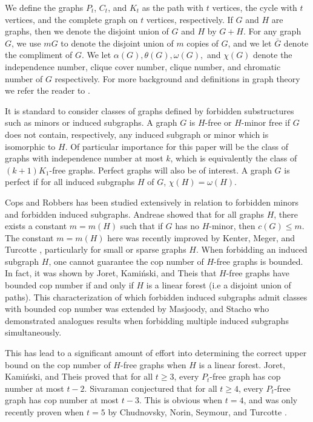 \documentclass[12pt]{amsart}
\theoremstyle{definition}
\begin{document}
We define the graphs $P_t$, $C_t$, and $K_t$ as the path with $t$ vertices, the cycle with $t$ vertices, and the complete graph on $t$ vertices, respectively.
If $G$ and $H$ are graphs, then we denote the disjoint union of $G$ and $H$ by $G+H$.
For any graph $G$, we use $mG$ to denote the disjoint union of $m$ copies of $G$, and we let $\bar{G}$ denote the compliment of $G$.
We let $\alpha(G),\theta(G),\omega(G),$ and $\chi(G)$ denote the independence number, clique cover number, clique number, and chromatic number of $G$ respectively.
For more background and definitions in graph theory we refer the reader to \cite{west2001introduction}.

It is standard to consider classes of graphs defined by forbidden substructures such as minors or induced subgraphs.
A graph $G$ is $H$-free or $H$-minor free if $G$ does not
contain, respectively, any induced subgraph or minor which is isomorphic to $H$. 
Of particular importance for this paper will be the class of graphs with independence number at most $k$, 
which is equivalently the class of $(k+1)K_1$-free graphs.
Perfect graphs will also be of interest.
A graph $G$ is perfect if for all induced subgraphs $H$ of $G$, $\chi(H) = \omega(H)$.


Cops and Robbers has been studied extensively in relation to forbidden minors and forbidden induced subgraphs.
Andreae \cite{andreae1986pursuit} showed that for all graphs $H$, there exists a constant $m = m(H)$
such that if $G$ has no $H$-minor, then $c(G) \leq m$.
The constant $m = m(H)$ here was recently improved by Kenter, Meger, and Turcotte \cite{kenter2025improved},
particularly for small or sparse graphs $H$.
When forbidding an induced subgraph $H$, one cannot guarantee the cop number of $H$-free graphs is bounded.
In fact, it was shown by Joret, Kami{\'n}ski, and Theis \cite{joret2010cops} 
that $H$-free graphs have bounded cop number if and only if $H$ is a linear forest (i.e a disjoint union of paths).
This characterization of which forbidden induced subgraphs admit classes with bounded cop number was extended by Masjoody, and Stacho \cite{masjoody2020cops}
who demonstrated analogues results when forbidding multiple induced subgraphs simultaneously.

This has lead to a significant amount of effort into determining the correct upper bound on the cop number of $H$-free graphs when $H$ is a linear forest.
Joret, Kami{\'n}ski, and Theis \cite{joret2010cops} proved that for all $t\geq 3$, every $P_t$-free graph has cop number at most $t-2$.
Sivaraman \cite{sivaraman2019application} conjectured that for all $t\geq 4$, every $P_t$-free graph has cop number at most $t-3$.
This is obvious when $t=4$, and was only recently proven when $t=5$ by Chudnovsky, Norin, Seymour, and Turcotte \cite{chudnovsky2024cops}.
\end{document}
